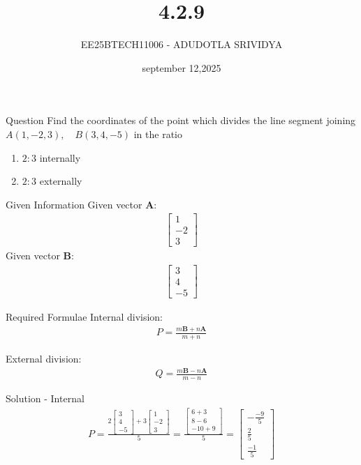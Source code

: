 \documentclass{beamer}
\title %
{4.2.9}
\date{september 12,2025}
\author %
{EE25BTECH11006 - ADUDOTLA SRIVIDYA}
\begin{document}
\frame{\titlepage}

\begin{frame}{Question}
Find the coordinates of the point which divides the line segment joining
$
A(1,-2,3), \quad B(3,4,-5)
$
in the ratio
\begin{enumerate}[label=(\alph*)]
    \item \(2 : 3\) internally
    \item \(2 : 3\) externally
\end{enumerate}
\end{frame}

\begin{frame}{Given Information}
Given vector \(\mathbf{A}\):
\begin{align}
\begin{bmatrix} 1 \\ -2 \\ 3 \end{bmatrix}
\end{align}
Given vector \(\mathbf{B}\):
\begin{align}
\begin{bmatrix} 3 \\ 4 \\ -5 \end{bmatrix}
\end{align}
\end{frame}

\begin{frame}{Required Formulae}
Internal division:
\begin{align}
P = \frac{m \mathbf{B} + n \mathbf{A}}{m + n}
\end{align}

External division:
\begin{align}
Q = \frac{m \mathbf{B} - n \mathbf{A}}{m - n}
\end{align}
\end{frame}

\begin{frame}{Solution - Internal}
\begin{align}
P = \frac{2 \begin{bmatrix} 3 \\ 4 \\ -5 \end{bmatrix} + 3 \begin{bmatrix} 1 \\ -2 \\ 3 \end{bmatrix}}{5}
= \frac{\begin{bmatrix} 6 + 3 \\ 8 - 6 \\ -10 + 9 \end{bmatrix}}{5}
= \begin{bmatrix} -\frac{-9}{5} \\ \frac{2}{5} \\ \frac{-1}{5} \end{bmatrix}
\end{align}
\end{frame}
\end{document}
